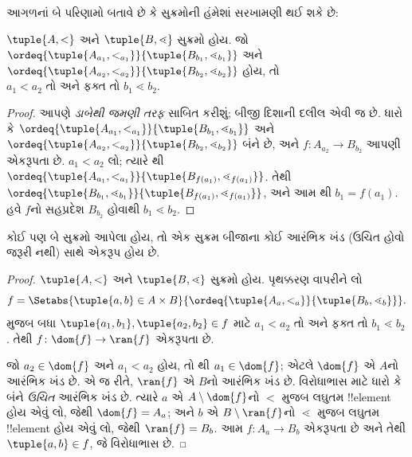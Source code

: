 \documentclass[../../../include/open-logic-section]{subfiles}
\begin{document}
આગળનાં બે પરિણામો બતાવે છે કે સુક્રમોની હંમેશાં
સરખામણી થઈ શકે છે:

\begin{lem}
$\tuple{A, <}$ અને $\tuple{B, \lessdot}$ સુક્રમો હોય.
જો
$\ordeq{\tuple{A_{a_1}, <_{a_1}}}{\tuple{B_{b_1}, \lessdot_{b_1}}}$
અને
$\ordeq{\tuple{A_{{a_2}}, <_{a_2}}}{\tuple{B_{{b_2}},
\lessdot_{b_2}}}$ હોય, તો
$ {a_1}  < {a_2} \text{ તો અને ફક્ત તો }{b_1} \lessdot
{b_2}$.
\end{lem}

\begin{proof}
આપણે \emph{ડાબેથી જમણી તરફ} સાબિત કરીશું;
બીજી દિશાની દલીલ એવી જ છે.
ધારો કે
$\ordeq{\tuple{A_{a_1}, <_{a_1}}}{\tuple{B_{b_1},
\lessdot_{b_1}}}$ અને
$\ordeq{\tuple{A_{{a_2}},
<_{a_2}}}{\tuple{B_{{b_2}}, \lessdot_{b_2}}}$ બંને છે,
અને $f \colon
A_{{a_2}} \to B_{{b_2}}$ આપણી એકરૂપતા છે.
$ {a_1} < {a_2}$ લો; ત્યારે
થી
$\ordeq{\tuple{A_{a_1}, <_{a_1}}}{\tuple{B_{f({a_1})},
\lessdot_{f({a_1})}}}$.
તેથી
$\ordeq{\tuple{B_{b_1}, \lessdot_{b_1}}}{\tuple{B_{f({a_1})},
\lessdot_{f({a_1})}}}$, અને આમ
થી
$ {b_1} = f({a_1})$.
હવે $f$નો સહપ્રદેશ $B_{{b_2}}$ હોવાથી
$ {b_1} \lessdot {b_2}$.
\end{proof}

\begin{thm}
કોઈ પણ બે સુક્રમો આપેલા હોય, તો એક સુક્રમ બીજાના
કોઈ આરંભિક ખંડ (ઉચિત હોવો જરૂરી નથી) સાથે એકરૂપ હોય છે.
\end{thm}

\begin{proof}
$\tuple{A, <}$ અને $\tuple{B, \lessdot}$ સુક્રમો
હોય. પૃથક્કરણ વાપરીને લો
\[
	f = \Setabs{\tuple{a, b} \in A \times B}{
		\ordeq{\tuple{A_a, <_a}}{\tuple{B_b, \lessdot_b}}}.
\]
 મુજબ બધા
$\tuple{a_1, b_1}, \tuple{a_2, b_2} \in f$ માટે
$a_1 < a_2$ તો અને ફક્ત તો
$b_1 \lessdot b_2$. તેથી
$f \colon \dom{f} \to
\ran{f}$ એકરૂપતા છે.

જો $a_2 \in \dom{f}$ અને $a_1 < a_2$ હોય, તો
થી
$a_1 \in \dom{f}$; એટલે $\dom{f}$ એ $A$નો
આરંભિક ખંડ છે. એ જ રીતે, $\ran{f}$ એ $B$નો
આરંભિક ખંડ છે. વિરોધાભાસ માટે ધારો કે બંને
\emph{ઉચિત} આરંભિક ખંડ છે. ત્યારે $a$ એ
$A \setminus \dom{f}$નો $<$ મુજબ લઘુતમ
!!{element} હોય એવું લો, જેથી $\dom{f} =
A_a$; અને $b$ એ
$B \setminus
\ran{f}$નો $\lessdot$ મુજબ લઘુતમ
!!{element} હોય એવું લો, જેથી
$\ran{f} = B_b$. આમ
$f \colon A_a \to B_b$ એકરૂપતા છે અને તેથી
$\tuple{a, b} \in f$, જે વિરોધાભાસ છે.
\end{proof}
\end{document}

